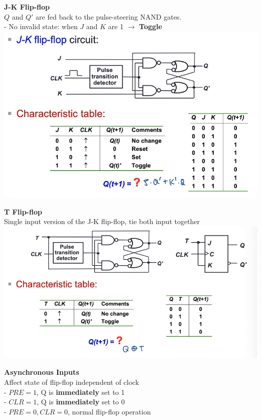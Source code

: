 \documentclass[10pt, a4paper]{article}
\newcommand{\highlight}[1]{{\color{red}\textbf{#1}}}
\begin{document}
\begin{multicols*}{3}
		\textbf{J-K Flip-flop}\\
		$Q$ and $Q'$ are fed back to the pulse-steering NAND gates.\\
		- No invalid state: when $J$ and $K$ are 1 $\rightarrow$ \highlight{Toggle}\\
		\includegraphics[scale=.5]{./assets/JKFlipFlop}
		
		\textbf{T Flip-flop}\\
		Single input version of the J-K flip-flop, tie both input together\\
		\includegraphics[scale=.5]{./assets/TFlipFlop}
		
		\textbf{Asynchronous Inputs}\\
		Affect state of flip-flop independent of clock\\
		- $PRE = 1$, Q is \highlight{immediately} set to 1\\
		- $CLR = 1$, Q is \highlight{immediately} set to 0\\
		- $PRE = 0, CLR = 0$, normal flip-flop operation\\
		

\end{multicols*}
\end{document}
